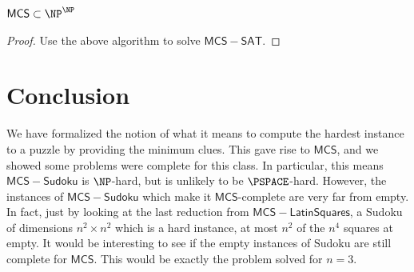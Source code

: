 \documentclass[runningheads,a4paper]{llncs}
\begin{document}
\begin{proposition}
$\mathsf{MCS} \subset \NP^\NP$
\end{proposition}

\begin{proof}
Use the above algorithm to solve $\mathsf{MCS-SAT}$. 
\end{proof}

\section{Conclusion}

We have formalized the notion of what it means to compute the hardest instance to a puzzle by providing the minimum clues. This gave rise to $\mathsf{MCS}$, and we showed some problems were complete for this class. In particular, this means $\mathsf{MCS-Sudoku}$ is $\NP$-hard, but is unlikely to be $\PSPACE$-hard. However, the instances of $\mathsf{MCS-Sudoku}$ which make it $\mathsf{MCS}$-complete are very far from empty. In fact, just by looking at the last reduction from $\mathsf{MCS-Latin Squares}$, a Sudoku of dimensions $n^2 \times n^2$ which is a hard instance, at most $n^2$ of the $n^4$ squares at empty. It would be interesting to see if the empty instances of Sudoku are still complete for $\mathsf{MCS}$. This would be exactly the problem \cite{mcguire2012there} solved for $n = 3$. 



\end{document}
